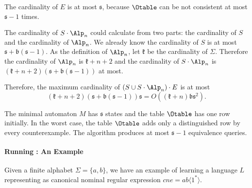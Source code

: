 The cardinality of $E$ is at most $\mathfrak{s}$, because $\Otable$ can be not consistent at most $\mathfrak{s}-1$ times.   

The cardinality of $S\cdot \Alp_n$ could calculate from two parts: the cardinality of $S$ and the cardinality of $\Alp_n$. We already know the cardinality of $S$ is at most $\mathfrak{s}+\mathfrak{b}(\mathfrak{s}-1)$. As the definition of $\Alp_n$, let $\mathfrak{k}$ be the cardinality of $\Sigma$. Therefore the cardinality of $\Alp_n$ is $\mathfrak{k}+n+2$ and the cardinality of $S\cdot \Alp_n$ is $(\mathfrak{k}+n+2)(\mathfrak{s}+\mathfrak{b}(\mathfrak{s}-1))$ at most.

Therefore, the maximum cardinality of $(S\cup S\cdot \Alp_n)\cdot E$ is at most $$(\mathfrak{k}+n+2)(\mathfrak{s}+\mathfrak{b}(\mathfrak{s}-1))\mathfrak{s}=O((\mathfrak{k}+n)\mathfrak{b}\mathfrak{s}^2).$$ 

The minimal automaton $M$ has $\mathfrak{s}$ states and the table $\Otable$ has one row initially. In the worst case, the table $\Otable$ adds only a distinguished row by every counterexample. The algorithm produces at most $\mathfrak{s}-1$  equivalence queries.

\paragraph{Running \nlstar: An Example}
Given a finite alphabet $\Sigma=\{a,b\}$, we have an example of learning a language $L$ representing as canonical nominal regular expression $cne=ab\langle 1^*\rangle$. 

